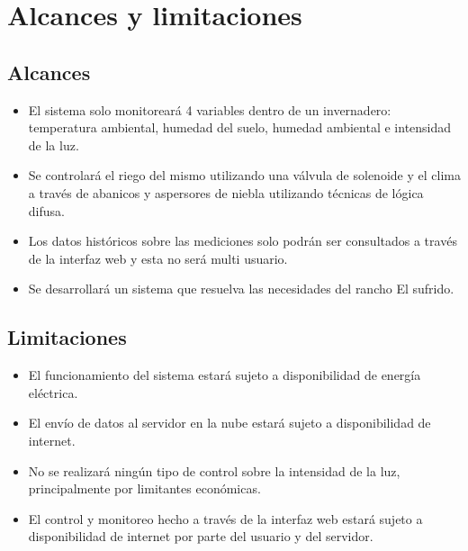 \section{Alcances y limitaciones}

\subsection*{Alcances}
\begin{itemize}
    \item El sistema solo monitoreará 4 variables dentro de un invernadero: temperatura ambiental, humedad del suelo, humedad ambiental e intensidad de la luz.
    \item Se controlará el riego del mismo utilizando una válvula de solenoide y el clima a través de abanicos y aspersores de niebla utilizando técnicas de lógica difusa. 
    \item Los datos históricos sobre las mediciones solo podrán ser consultados a través de la interfaz web y esta no será multi usuario.
    \item Se desarrollará un sistema que resuelva las necesidades del rancho El sufrido.
\end{itemize}

\subsection*{Limitaciones}
\begin{itemize}
    \item El funcionamiento del sistema estará sujeto a disponibilidad de energía eléctrica.
    \item El envío de datos al servidor en la nube estará sujeto a disponibilidad de internet.
    \item No se realizará ningún tipo de control sobre la intensidad de la luz, principalmente por limitantes económicas.
    \item El control y monitoreo hecho a través de la interfaz web estará sujeto a disponibilidad de internet por parte del usuario y del servidor.
\end{itemize}
